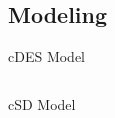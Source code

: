 \subsection*{Modeling}

\begin{myslide}{c}{DES Model}

\begin{columns}

\begin{column}{1\textwidth}


\end{column}

\end{columns}

\end{myslide}

\begin{myslide}{c}{SD Model}

\begin{columns}

\begin{column}{1\textwidth}


\end{column}

\end{columns}

\end{myslide}